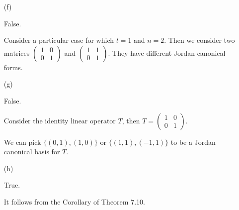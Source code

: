 \begin{Exercise}
\begin{enumerate}[(a)]
		\item[(f)]
		\begin{answer}
			False.
		\end{answer}
		\begin{solution}
			Consider a particular case for which $t = 1$ and $n = 2$. Then we consider two matrices $\begin{pmatrix}
			1 & 0 \\
			0 & 1
			\end{pmatrix}$ and $\begin{pmatrix}
			1 & 1 \\
			0 & 1
			\end{pmatrix}$. They have different Jordan canonical forms.
		\end{solution}
		
		\item[(g)]
		\begin{answer}
			False.
		\end{answer}
		\begin{solution}
			Consider the identity linear operator $T$, then $T = \begin{pmatrix}
			1 & 0 \\
			0 & 1
			\end{pmatrix}$. 
			
			We can pick $\{(0,1),(1,0)\}$ or $\{(1,1),(-1,1)\}$ to be a Jordan canonical basis for $T$.
		\end{solution}
		
		\item[(h)]
		\begin{answer}
			True.
		\end{answer}
		\begin{solution}
			It follows from the Corollary of Theorem 7.10.
		\end{solution}
		
	\end{enumerate}
\end{Exercise}